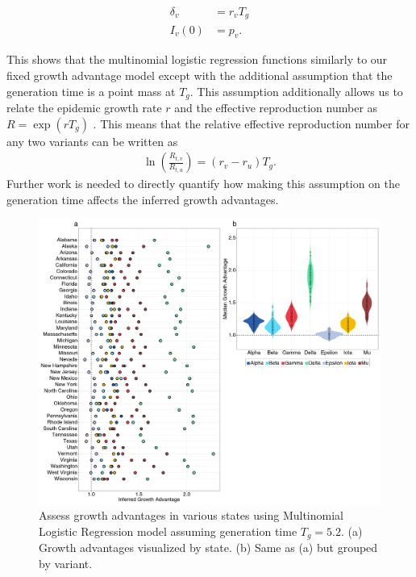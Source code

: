 \documentclass[11pt,oneside,letterpaper]{article}
\begin{document}
\begin{align}
  \delta_{v} &= r_{v}T_{g}\\
  I_{v}(0) &= p_{v}.
\end{align}

This shows that the multinomial logistic regression functions similarly to our fixed growth advantage model except with the additional assumption that the generation time is a point mass at $T_{g}$.
This assumption additionally allows us to relate the epidemic growth rate $r$ and the effective reproduction number as $R = \exp(r T_{g})$ \cite{Wallinga2006}. This means that the relative effective reproduction number for any two variants can be written as
\begin{align*}
\ln \left( \frac{R_{t,v}}{R_{t,u}} \right) = (r_{v} - r_{u}) T_{g}.
\end{align*}
Further work is needed to directly quantify how making this assumption on the generation time affects the inferred growth advantages.

\begin{figure}
  \centering
  \includegraphics[width=\linewidth]{figs/fig_MLR_growth_advantages_supp.png}
  \caption{Assess growth advantages in various states using Multinomial Logistic Regression model assuming generation time $T_{g} = 5.2$.
  (a) Growth advantages visualized by state.
  (b) Same as (a) but grouped by variant.}%
  \label{fig:MLR_growth_advantages}
\end{figure}


\end{document}
